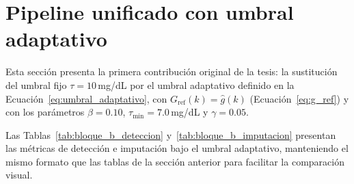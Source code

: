 \documentclass{report}
\begin{document}

\section{Pipeline unificado con umbral adaptativo}
\label{sec:pipeline_unificado_adaptativo}

Esta sección presenta la primera contribución original de la tesis: la sustitución del umbral fijo $\tau = 10$\,mg/dL por el umbral adaptativo definido en la Ecuación~\eqref{eq:umbral_adaptativo}, con $G_{\mathrm{ref}}(k) = \hat{g}(k)$ (Ecuación~\eqref{eq:g_ref}) y con los parámetros $\beta = 0.10$, $\tau_{\min} = 7.0$\,mg/dL y $\gamma = 0.05$.




Las Tablas~\ref{tab:bloque_b_deteccion} y~\ref{tab:bloque_b_imputacion}
presentan las métricas de detección e imputación bajo el umbral adaptativo,
manteniendo el mismo formato que las tablas de la sección anterior para
facilitar la comparación visual.
\end{document}
